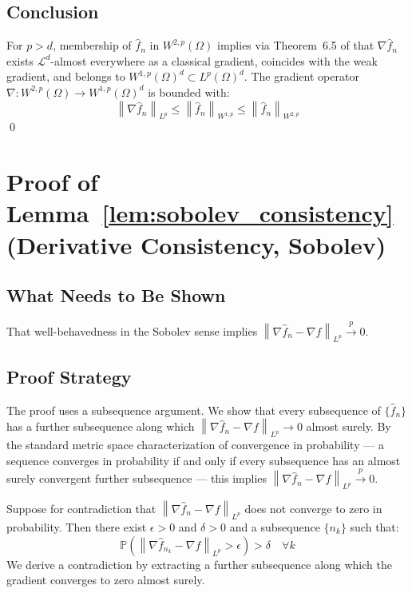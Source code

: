 \documentclass[12pt]{article}
\newcommand{\norm}[1]{\left\| #1 \right\|}
\newcommand{\fn}{\hat{f}_n}
\newcommand{\xrightarrowp}{\xrightarrow{p}}
\begin{document}
	\subsection{Conclusion}
	
	For $p > d$, membership of $\fn$ in $W^{2,p}(\Omega)$ implies via
	Theorem~6.5 of \citet{evans2015measure} that $\nabla \fn$ exists
	$\mathcal{L}^d$-almost everywhere as a classical gradient, coincides with
	the weak gradient, and belongs to $W^{1,p}(\Omega)^d \subset L^p(\Omega)^d$.
	The gradient operator $\nabla: W^{2,p}(\Omega) \to W^{1,p}(\Omega)^d$ is
	bounded with:
	\begin{equation}
		\norm{\nabla \fn}_{L^p}
		\leq \norm{\fn}_{W^{1,p}}
		\leq \norm{\fn}_{W^{2,p}}
	\end{equation}
	\qed
	
	\section{Proof of Lemma~\ref{lem:sobolev_consistency}
		(Derivative Consistency, Sobolev)}
	\label{app:lem_sobolev_consistency}
	
	\subsection{What Needs to Be Shown}
	
	That well-behavedness in the Sobolev sense implies
	$\norm{\nabla \fn - \nabla f}_{L^p} \xrightarrowp 0$.
	
	\subsection{Proof Strategy}
	
	The proof uses a subsequence argument. We show that every subsequence of
	$\{\fn\}$ has a further subsequence along which
	$\norm{\nabla \fn - \nabla f}_{L^p} \to 0$ almost surely. By the standard
	metric space characterization of convergence in probability --- a sequence
	converges in probability if and only if every subsequence has an almost
	surely convergent further subsequence --- this implies
	$\norm{\nabla \fn - \nabla f}_{L^p} \xrightarrowp 0$.
	
	Suppose for contradiction that $\norm{\nabla \fn - \nabla f}_{L^p}$ does
	not converge to zero in probability. Then there exist $\epsilon > 0$ and
	$\delta > 0$ and a subsequence $\{n_k\}$ such that:
	\begin{equation}
		\mathbb{P}\!\left(\norm{\nabla \hat{f}_{n_k} - \nabla f}_{L^p}
		> \epsilon\right) > \delta
		\quad \forall k
	\end{equation}
	We derive a contradiction by extracting a further subsequence along which
	the gradient converges to zero almost surely.
	
\end{document}
